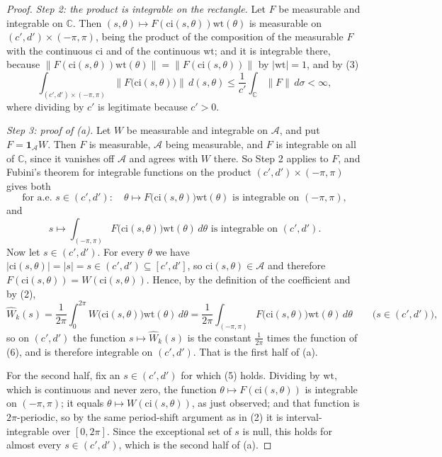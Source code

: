 \begin{proof}
\emph{Step 2: the product is integrable on the rectangle.}  Let $F$ be
measurable and integrable on $\mathbb{C}$.  Then
$(s,\theta)\mapsto F(\mathrm{ci}(s,\theta))\mathrm{wt}(\theta)$ is measurable
on $(c',d')\times(-\pi,\pi)$, being the product of the composition of the
measurable $F$ with the continuous $\mathrm{ci}$ and of the continuous
$\mathrm{wt}$; and it is integrable there, because
$\|F(\mathrm{ci}(s,\theta))\mathrm{wt}(\theta)\|
=\|F(\mathrm{ci}(s,\theta))\|$ by $|\mathrm{wt}|=1$, and by (3)
\begin{equation}\tag{4}
  \int_{(c',d')\times(-\pi,\pi)}
    \bigl\|F\bigl(\mathrm{ci}(s,\theta)\bigr)\bigr\|\,d(s,\theta)
  \le\frac1{c'}\int_{\mathbb{C}}\|F\|\,d\sigma<\infty ,
\end{equation}
where dividing by $c'$ is legitimate because $c'>0$.

\emph{Step 3: proof of (a).}  Let $W$ be measurable and integrable on
$\mathcal{A}$, and put $F=\mathbf1_{\mathcal{A}}W$.  Then $F$ is measurable,
$\mathcal{A}$ being measurable, and $F$ is integrable on all of $\mathbb{C}$,
since it vanishes off $\mathcal{A}$ and agrees with $W$ there.  So Step 2
applies to $F$, and Fubini's theorem for integrable functions on the product
$(c',d')\times(-\pi,\pi)$ gives both
\begin{equation}\tag{5}
  \text{for a.e. }s\in(c',d'):\quad
  \theta\mapsto F\bigl(\mathrm{ci}(s,\theta)\bigr)\mathrm{wt}(\theta)
  \text{ is integrable on }(-\pi,\pi),
\end{equation}
and
\begin{equation}\tag{6}
  s\mapsto\int_{(-\pi,\pi)}F\bigl(\mathrm{ci}(s,\theta)\bigr)
    \mathrm{wt}(\theta)\,d\theta
  \text{ is integrable on }(c',d').
\end{equation}
Now let $s\in(c',d')$.  For every $\theta$ we have
$|\mathrm{ci}(s,\theta)|=|s|=s\in(c',d')\subseteq[c',d']$, so
$\mathrm{ci}(s,\theta)\in\mathcal{A}$ and therefore
$F(\mathrm{ci}(s,\theta))=W(\mathrm{ci}(s,\theta))$.  Hence, by the definition
of the coefficient and by (2),
\[
  \widehat W_k(s)
  =\frac1{2\pi}\int_0^{2\pi}W\bigl(\mathrm{ci}(s,\theta)\bigr)
     \mathrm{wt}(\theta)\,d\theta
  =\frac1{2\pi}\int_{(-\pi,\pi)}F\bigl(\mathrm{ci}(s,\theta)\bigr)
     \mathrm{wt}(\theta)\,d\theta
  \qquad\bigl(s\in(c',d')\bigr),
\]
so on $(c',d')$ the function $s\mapsto\widehat W_k(s)$ is the constant
$\frac1{2\pi}$ times the function of (6), and is therefore integrable on
$(c',d')$.  That is the first half of (a).

For the second half, fix an $s\in(c',d')$ for which (5) holds.  Dividing by
$\mathrm{wt}$, which is continuous and never zero, the function
$\theta\mapsto F(\mathrm{ci}(s,\theta))$ is integrable on $(-\pi,\pi)$; it
equals $\theta\mapsto W(\mathrm{ci}(s,\theta))$, as just observed; and that
function is $2\pi$-periodic, so by the same period-shift argument as in (2) it
is interval-integrable over $[0,2\pi]$.  Since the exceptional set of $s$ is
null, this holds for almost every $s\in(c',d')$, which is the second half of
(a).


\end{proof}

